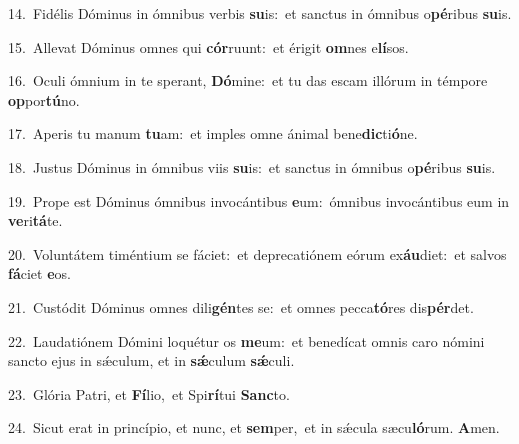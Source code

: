 {\numbfont\textcolor{\numbcolor}{14.}}~Fidélis Dóminus in ómnibus verbis \textbf{su}\-is:~\star et sanctus in ómnibus o\-\textbf{pé}\-ribus \textbf{su}\-is.\par
{\numbfont\textcolor{\numbcolor}{15.}}~Allevat Dóminus omnes qui \textbf{cór}\-ruunt:~\star et érigit \textbf{om}\-nes e\-\textbf{lí}\-sos.\par
{\numbfont\textcolor{\numbcolor}{16.}}~Oculi ómnium in te sperant, \textbf{Dó}\-mine:~\star et tu das escam illórum in témpore \textbf{op}\-por\-\textbf{tú}\-no.\par
{\numbfont\textcolor{\numbcolor}{17.}}~Aperis tu manum \textbf{tu}\-am:~\star et imples omne ánimal bene\-\textbf{dic}\-ti\-\textbf{ó}\-ne.\par
{\numbfont\textcolor{\numbcolor}{18.}}~Justus Dóminus in ómnibus viis \textbf{su}\-is:~\star et sanctus in ómnibus o\-\textbf{pé}\-ribus \textbf{su}\-is.\par
{\numbfont\textcolor{\numbcolor}{19.}}~Prope est Dóminus ómnibus invocántibus \textbf{e}\-um:~\star ómnibus invocántibus eum in \textbf{ve}\-ri\-\textbf{tá}\-te.\par
{\numbfont\textcolor{\numbcolor}{20.}}~Voluntátem timéntium se fáciet:~\dagger et deprecatiónem eórum ex\-\textbf{áu}\-diet:~\star et salvos \textbf{fá}\-ciet \textbf{e}\-os.\par
{\numbfont\textcolor{\numbcolor}{21.}}~Custódit Dóminus omnes dili\-\textbf{gén}\-tes se:~\star et omnes pecca\-\textbf{tó}\-res dis\-\textbf{pér}\-det.\par
{\numbfont\textcolor{\numbcolor}{22.}}~Laudatiónem Dómini loquétur os \textbf{me}\-um:~\star et benedícat omnis caro nómini sancto ejus in sǽculum, et in \textbf{sǽ}\-culum \textbf{sǽ}\-culi.\par
{\numbfont\textcolor{\numbcolor}{23.}}~Glória Patri, et \textbf{Fí}\-lio,~\star et Spi\-\textbf{rí}\-tui \textbf{Sanc}\-to.\par
{\numbfont\textcolor{\numbcolor}{24.}}~Sicut erat in princípio, et nunc, et \textbf{sem}\-per,~\star et in sǽcula sæcu\-\textbf{ló}\-rum. \textbf{A}\-men.\par
